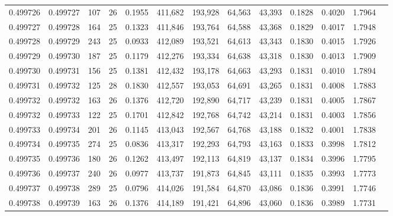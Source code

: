 \begin{tabular}{rrrrrrrrrrrrr}
0.499726 & 0.499727 & 107 &  26 &                                     0.1955 & 411,682 & 193,928 &  64,563 &  43,393 & 0.1828 & 0.4020 & 1.7964 \\
0.499727 & 0.499728 & 164 &  25 &                                     0.1323 & 411,846 & 193,764 &  64,588 &  43,368 & 0.1829 & 0.4017 & 1.7948 \\
0.499728 & 0.499729 & 243 &  25 &                                     0.0933 & 412,089 & 193,521 &  64,613 &  43,343 & 0.1830 & 0.4015 & 1.7926 \\
0.499729 & 0.499730 & 187 &  25 &                                     0.1179 & 412,276 & 193,334 &  64,638 &  43,318 & 0.1830 & 0.4013 & 1.7909 \\
0.499730 & 0.499731 & 156 &  25 &                                     0.1381 & 412,432 & 193,178 &  64,663 &  43,293 & 0.1831 & 0.4010 & 1.7894 \\
0.499731 & 0.499732 & 125 &  28 &                                     0.1830 & 412,557 & 193,053 &  64,691 &  43,265 & 0.1831 & 0.4008 & 1.7883 \\
0.499732 & 0.499732 & 163 &  26 &                                     0.1376 & 412,720 & 192,890 &  64,717 &  43,239 & 0.1831 & 0.4005 & 1.7867 \\
0.499732 & 0.499733 & 122 &  25 &                                     0.1701 & 412,842 & 192,768 &  64,742 &  43,214 & 0.1831 & 0.4003 & 1.7856 \\
0.499733 & 0.499734 & 201 &  26 &                                     0.1145 & 413,043 & 192,567 &  64,768 &  43,188 & 0.1832 & 0.4001 & 1.7838 \\
0.499734 & 0.499735 & 274 &  25 &                                     0.0836 & 413,317 & 192,293 &  64,793 &  43,163 & 0.1833 & 0.3998 & 1.7812 \\
0.499735 & 0.499736 & 180 &  26 &                                     0.1262 & 413,497 & 192,113 &  64,819 &  43,137 & 0.1834 & 0.3996 & 1.7795 \\
0.499736 & 0.499737 & 240 &  26 &                                     0.0977 & 413,737 & 191,873 &  64,845 &  43,111 & 0.1835 & 0.3993 & 1.7773 \\
0.499737 & 0.499738 & 289 &  25 &                                     0.0796 & 414,026 & 191,584 &  64,870 &  43,086 & 0.1836 & 0.3991 & 1.7746 \\
0.499738 & 0.499739 & 163 &  26 &                                     0.1376 & 414,189 & 191,421 &  64,896 &  43,060 & 0.1836 & 0.3989 & 1.7731 \\

\end{tabular}
